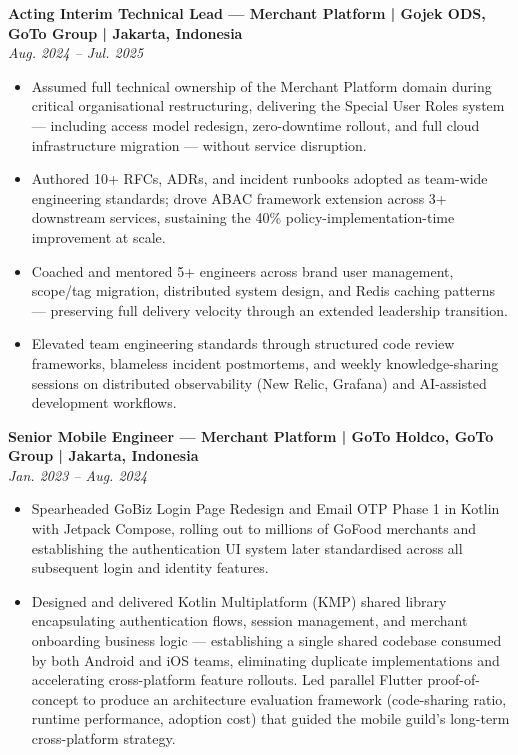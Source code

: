 \documentclass[10pt]{article}
\begin{document}
\smallskip
\textbf{Acting Interim Technical Lead --- Merchant Platform | Gojek ODS, GoTo Group | Jakarta, Indonesia}\\
\textit{Aug. 2024 -- Jul. 2025}
\begin{itemize}
\item Assumed full technical ownership of the Merchant Platform domain during critical organisational restructuring, delivering the Special User Roles system --- including access model redesign, zero-downtime rollout, and full cloud infrastructure migration --- without service disruption.
\item Authored 10+ RFCs, ADRs, and incident runbooks adopted as team-wide engineering standards; drove ABAC framework extension across 3+ downstream services, sustaining the 40\% policy-implementation-time improvement at scale.
\item Coached and mentored 5+ engineers across brand user management, scope/tag migration, distributed system design, and Redis caching patterns --- preserving full delivery velocity through an extended leadership transition.
\item Elevated team engineering standards through structured code review frameworks, blameless incident postmortems, and weekly knowledge-sharing sessions on distributed observability (New Relic, Grafana) and AI-assisted development workflows.
\end{itemize}

\smallskip
\textbf{Senior Mobile Engineer --- Merchant Platform | GoTo Holdco, GoTo Group | Jakarta, Indonesia}\\
\textit{Jan. 2023 -- Aug. 2024}
\begin{itemize}
\item Spearheaded GoBiz Login Page Redesign and Email OTP Phase 1 in Kotlin with Jetpack Compose, rolling out to millions of GoFood merchants and establishing the authentication UI system later standardised across all subsequent login and identity features.
\item Designed and delivered Kotlin Multiplatform (KMP) shared library encapsulating authentication flows, session management, and merchant onboarding business logic --- establishing a single shared codebase consumed by both Android and iOS teams, eliminating duplicate implementations and accelerating cross-platform feature rollouts. Led parallel Flutter proof-of-concept to produce an architecture evaluation framework (code-sharing ratio, runtime performance, adoption cost) that guided the mobile guild's long-term cross-platform strategy.
\end{itemize}
\end{document}
